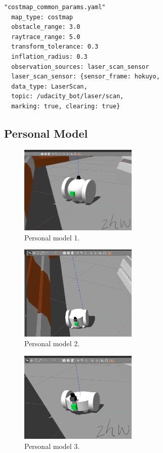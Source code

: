 \documentclass[10pt,journal,compsoc]{IEEEtran}
\begin{document}
\begin{lstlisting}
"costmap_common_params.yaml"
  map_type: costmap
  obstacle_range: 3.0
  raytrace_range: 5.0
  transform_tolerance: 0.3
  inflation_radius: 0.3
  observation_sources: laser_scan_sensor
  laser_scan_sensor: {sensor_frame: hokuyo, 
  data_type: LaserScan, 
  topic: /udacity_bot/laser/scan, 
  marking: true, clearing: true}
\end{lstlisting}


\subsection{Personal Model}

\begin{figure}
\centering
\includegraphics[width=0.5\textwidth]{r6.png}
\caption{\label{fig:frog}Personal model 1.}
\end{figure}

\begin{figure}
\centering
\includegraphics[width=0.5\textwidth]{r10.png}
\caption{\label{fig:frog}Personal model 2.}
\end{figure}

\begin{figure}
\centering
\includegraphics[width=0.5\textwidth]{r13.png}
\caption{\label{fig:frog}Personal model 3.}
\end{figure}
\end{document}
